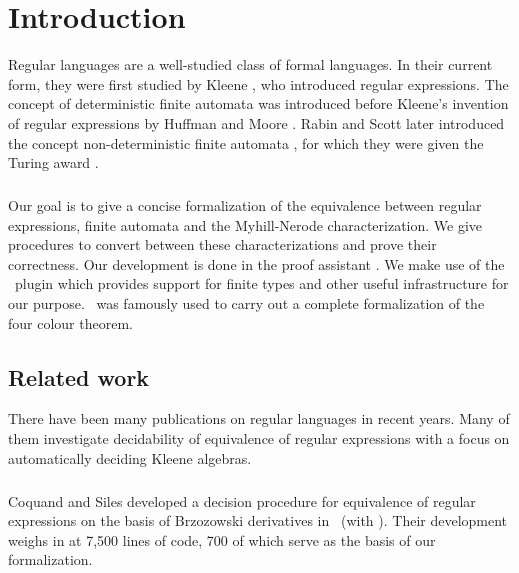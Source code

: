 \chapter{Introduction}
\label{chap:intro}

Regular languages are a well-studied class of formal languages. 
In their current form, they were first studied by Kleene \cite{KleeneNets}, who introduced regular expressions. 
The concept of deterministic finite automata was introduced before Kleene's invention of regular expressions by Huffman \cite{Huffman1954161} and Moore \cite{Moore56}. 
Rabin and Scott later introduced the concept non-deterministic finite automata \cite{RabinScott}, for which they were given the Turing award \cite{Ashenhurst:1987:ATA:27609}.

\paragraph{}
Our goal is to give a concise formalization of the equivalence between regular expressions, finite automata and the Myhill-Nerode characterization. 
We give procedures to convert between these characterizations and prove their correctness.
Our development is done in the proof assistant \coq.%
%
We make use of the \ssreflect\ plugin which provides support for finite types and other useful infrastructure for our purpose.
\ssreflect\ was famously used to carry out a complete formalization of the four colour theorem\cite{DBLP:conf/ascm/Gonthier07}.


\section{Related work}

There have been many publications on regular languages in recent years.
Many of them investigate decidability of equivalence of regular expressions with a focus on automatically deciding Kleene algebras.

\paragraph{}
Coquand and Siles developed a decision procedure for equivalence of regular expressions \cite{DBLP:conf/cpp/CoquandS11} on the basis of Brzozowski derivatives \cite{DBLP:journals/jacm/Brzozowski64} in \coq\ (with \ssreflect). Their development weighs in at 7,500 lines of code, 700 of which serve as the basis of our formalization.

